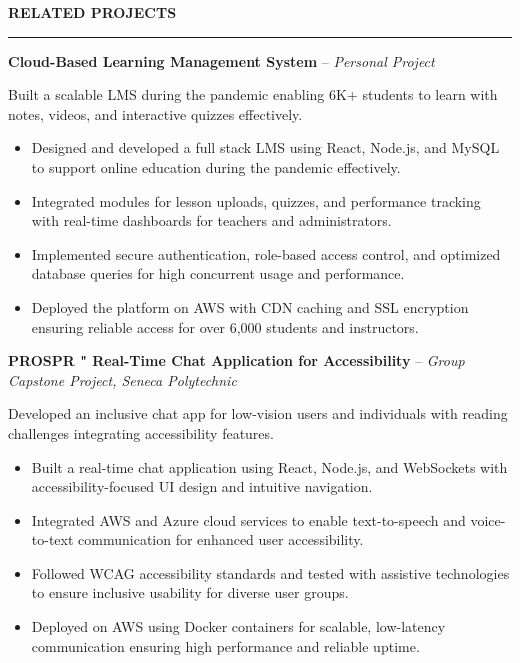 \documentclass[10pt,letterpaper]{article}
\begin{document}
\vspace{6pt}

\textbf{RELATED PROJECTS}\\[-8pt]
\noindent\rule{\textwidth}{1pt}

\vspace{-2pt}

\textbf{Cloud-Based Learning Management System} -- \emph{Personal Project}

\vspace{-1pt}

Built a scalable LMS during the pandemic enabling 6K+ students to learn with notes, videos, and interactive quizzes effectively.
\vspace{-1pt}
\begin{itemize}
\item Designed and developed a full stack LMS using React, Node.js, and MySQL to support online education during the pandemic effectively.
\item Integrated modules for lesson uploads, quizzes, and performance tracking with real-time dashboards for teachers and administrators.
\item Implemented secure authentication, role-based access control, and optimized database queries for high concurrent usage and performance.
\item Deployed the platform on AWS with CDN caching and SSL encryption ensuring reliable access for over 6,000 students and instructors.
\end{itemize}

\textbf{PROSPR " Real-Time Chat Application for Accessibility} -- \emph{Group Capstone Project, Seneca Polytechnic}

\vspace{-1pt}

Developed an inclusive chat app for low-vision users and individuals with reading challenges integrating accessibility features.
\vspace{-1pt}
\begin{itemize}
\item Built a real-time chat application using React, Node.js, and WebSockets with accessibility-focused UI design and intuitive navigation.
\item Integrated AWS and Azure cloud services to enable text-to-speech and voice-to-text communication for enhanced user accessibility.
\item Followed WCAG accessibility standards and tested with assistive technologies to ensure inclusive usability for diverse user groups.
\item Deployed on AWS using Docker containers for scalable, low-latency communication ensuring high performance and reliable uptime.
\end{itemize}
\end{document}
